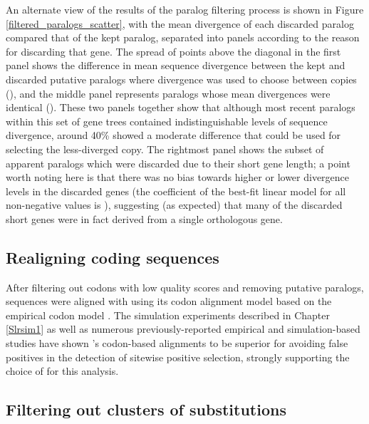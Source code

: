 An alternate view of the results of the paralog filtering process is
shown in Figure \ref{filtered_paralogs_scatter}, with the mean
divergence of each discarded paralog compared that of the kept
paralog, separated into panels according to the reason for discarding
that gene. The spread of points above the diagonal in the first panel
shows the difference in mean sequence divergence between the kept and
discarded putative paralogs where divergence was used to choose
between copies (), and the middle panel represents
paralogs whose mean divergences were identical (). These
two panels together show that although most recent paralogs within
this set of gene trees contained indistinguishable levels of sequence
divergence, around 40\% showed a moderate difference that could be
used for selecting the less-diverged copy. The rightmost panel shows
the subset of apparent paralogs which were discarded due to their
short gene length; a point worth noting here is that there was no bias
towards higher or lower divergence levels in the discarded genes (the
coefficient of the best-fit linear model for all non-negative values
is ), suggesting (as expected) that many of
the discarded short genes were in fact derived from a single
orthologous gene.

\subsection{Realigning coding sequences}

After filtering out codons with low quality scores and removing
putative paralogs, sequences were aligned with \prank \citep{TODO,
  Loytynoja Goldman 2008} using its codon alignment model based on the
empirical codon model \citep{TODO, Kosiol ecm}. The simulation
experiments described in Chapter \ref{Slrsim1} as well as numerous
previously-reported empirical and simulation-based studies have shown
\prank{}'s codon-based alignments to be superior for avoiding false
positives in the detection of sitewise positive selection, strongly
supporting the choice of \prank for this analysis.

\subsection{Filtering out clusters of \nsyn substitutions}

